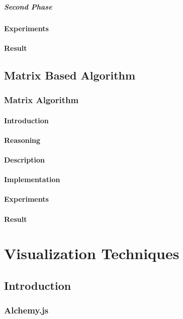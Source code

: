 \paragraph{Second Phase}

\subsubsection{Experiments}
\cite{githubtest1}
\subsubsection{Result}

\section{Matrix Based Algorithm}
\subsection{Matrix Algorithm}
\subsubsection{Introduction}
\subsubsection{Reasoning}
\subsubsection{Description}
\subsubsection{Implementation}
\subsubsection{Experiments}
\subsubsection{Result}

\chapter{Visualization Techniques}
\section{Introduction}
\subsection{Alchemy.js}
